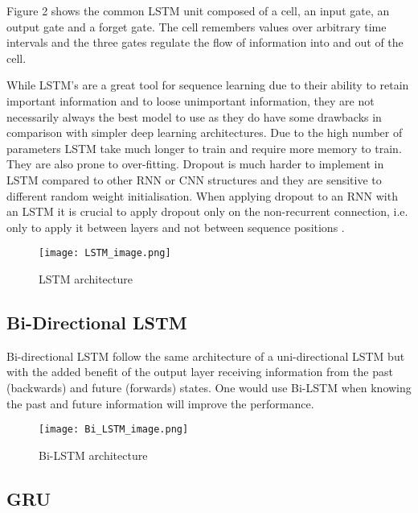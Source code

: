 \documentclass[twocolumn,12pt]{asme2ej}
\begin{document}
Figure 2 shows the common LSTM unit composed of a cell, an input gate, an output gate and a forget gate. The cell remembers values over arbitrary time intervals and the three gates regulate the flow of information into and out of the cell. 

While LSTM’s are a great tool for sequence learning due to their ability to retain important information and to loose unimportant information, they are not necessarily always the best model to use as they do have some drawbacks in comparison with simpler deep learning architectures. Due to the high number of parameters LSTM take much longer to train and require more memory to train. They are also prone to over-fitting. Dropout is much harder to implement in LSTM compared to other RNN or CNN structures and they are sensitive to different random weight initialisation. When applying dropout to an RNN with an LSTM it is crucial to apply dropout only on the non-recurrent connection, i.e. only to apply it between layers and not between sequence positions \cite{thedifficultyoftrainingRecurrentNeuralNetworks}.


\begin{figure}[h]
    \centering
    \texttt{[image: LSTM\_image.png]}
    \caption{LSTM architecture}
    \label{fig:my_label}
\end{figure}


\subsection{Bi-Directional LSTM}

Bi-directional LSTM follow the same architecture of a uni-directional LSTM but with the added benefit of the output layer receiving information from the past (backwards) and future (forwards) states. One would use Bi-LSTM when knowing the past and future information will improve the performance. 

\begin{figure}[h]
    \centering
    \texttt{[image: Bi\_LSTM\_image.png]}
    \caption{Bi-LSTM architecture}
    \label{fig:my_label}
\end{figure}


\subsection{GRU}
\end{document}
